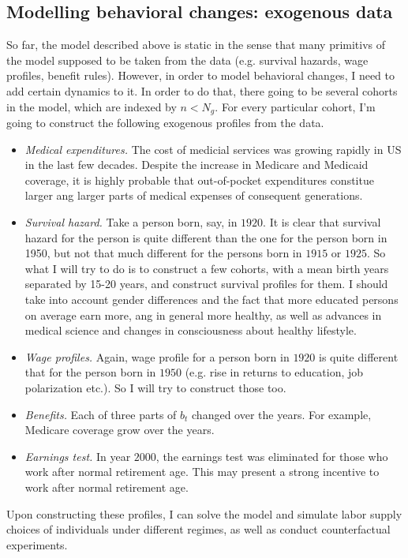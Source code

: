 \documentclass[
10pt, %
a4paper, %
oneside, %
headinclude,footinclude, %
BCOR5mm, %
]{scrartcl}
\begin{document}
\subsection{Modelling behavioral changes: exogenous data}
So far, the model described above is static in the sense that many primitivs of the model supposed to be taken from the data (e.g. survival hazards, wage profiles, benefit rules). However, in order to model behavioral changes, I need to add certain dynamics to it. In order to do that, there going to be several cohorts in the model, which are indexed by $n<N_g$. For every particular cohort, I'm going to construct the following exogenous profiles from the data. 
\begin{itemize}
\item \emph{Medical expenditures.} The cost of medicial services was growing rapidly in US in the last few decades. Despite the increase in Medicare and Medicaid coverage, it is highly probable that out-of-pocket expenditures constitue larger ang larger parts of medical expenses of consequent generations.
\item \emph{Survival hazard.} Take a person born, say, in $1920$. It is clear that survival hazard for the person is quite different than the one for the person born in 1950, but not that much different for the persons born in $1915$ or $1925$. So what I will try to do is to construct a few cohorts, with a mean birth years separated by 15-20 years, and construct survival profiles for them. I should take into account gender differences and the fact that more educated persons on average earn more, ang in general more healthy, as well as advances in medical science and changes in consciousness about healthy lifestyle.
\item \emph{Wage profiles.} Again, wage profile for a person born in $1920$ is quite different that for the person born in $1950$ (e.g. rise in returns to education, job polarization etc.). So I will try to construct those too.
\item \emph{Benefits.} Each of three parts of $b_t$ changed over the years. For example, Medicare coverage grow over the years.
\item \emph{Earnings test.} In year $2000$, the earnings test was eliminated for those who work after normal retirement age. This may present a strong incentive to work after normal retirement age. 
\end{itemize}

Upon constructing these profiles, I can solve the model and simulate labor supply choices of individuals under different regimes, as well as conduct counterfactual experiments.
\end{document}
